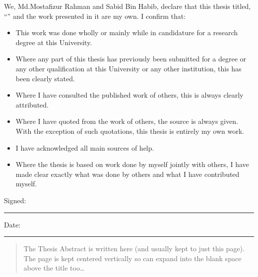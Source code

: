 \documentclass[
12pt, %
english, %
singlespacing, %
headsepline, %
]{MastersDoctoralThesis} %
\begin{document}
\begin{declaration}
\addchaptertocentry{\authorshipname}

\noindent We, Md.Mostafizur Rahman and Sabid Bin Habib, declare that this thesis titled, \enquote{\ttitle} and the work presented in it are my own. I confirm that:

\begin{itemize} 
\item This work was done wholly or mainly while in candidature for a research degree at this University.
\item Where any part of this thesis has previously been submitted for a degree or any other qualification at this University or any other institution, this has been clearly stated.
\item Where I have consulted the published work of others, this is always clearly attributed.
\item Where I have quoted from the work of others, the source is always given. With the exception of such quotations, this thesis is entirely my own work.
\item I have acknowledged all main sources of help.
\item Where the thesis is based on work done by myself jointly with others, I have made clear exactly what was done by others and what I have contributed myself.\\
\end{itemize}
 
\noindent Signed:\\
\rule[0.5em]{25em}{0.5pt} %
 
\noindent Date:\\
\rule[0.5em]{25em}{0.5pt} %
\end{declaration}



\begin{abstract}
\addchaptertocentry{\abstractname} %

The Thesis Abstract is written here (and usually kept to just this page). The page is kept centered vertically so can expand into the blank space above the title too\ldots

\end{abstract}
\end{document}
